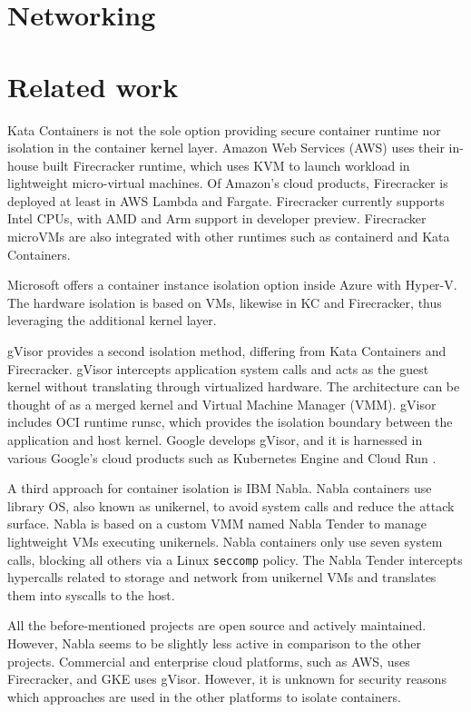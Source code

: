 \section{Networking}

\section{Related work}

Kata Containers is not the sole option providing secure container runtime nor isolation in the container kernel layer. Amazon Web Services (AWS) uses their in-house built Firecracker runtime, which uses KVM to launch workload in lightweight micro-virtual machines. Of Amazon's cloud products, Firecracker is deployed at least in AWS Lambda and Fargate. Firecracker currently supports Intel CPUs, with AMD and Arm support in developer preview. Firecracker microVMs are also integrated with other runtimes such as containerd and Kata Containers. \cite{AWS}\cite{Debab2021}\cite{FirecrackerDesign}

Microsoft offers a container instance isolation option inside Azure with Hyper-V. The hardware isolation is based on VMs, likewise in KC and Firecracker, thus leveraging the additional kernel layer. \cite{Hyper-V}

gVisor provides a second isolation method, differing from Kata Containers and Firecracker. gVisor intercepts application system calls and acts as the guest kernel without translating through virtualized hardware. The architecture can be thought of as a merged kernel and Virtual Machine Manager (VMM). gVisor includes OCI runtime runsc, which provides the isolation boundary between the application and host kernel. Google develops gVisor, and it is harnessed in various Google's cloud products such as Kubernetes Engine \cite{GKE} and Cloud Run \cite{CloudRun}. \cite{Debab2021}\cite{gVisor}

A third approach for container isolation is IBM Nabla\cite{Nabla}. Nabla containers use library OS, also known as unikernel, to avoid system calls and reduce the attack surface. Nabla is based on a custom VMM named Nabla Tender to manage lightweight VMs executing unikernels. Nabla containers only use seven system calls, blocking all others via a Linux \texttt{seccomp} policy. The Nabla Tender intercepts hypercalls related to storage and network from unikernel VMs and translates them into syscalls to the host. \cite{Debab2021}

All the before-mentioned projects are open source and actively maintained. However, Nabla seems to be slightly less active in comparison to the other projects. Commercial and enterprise cloud platforms, such as AWS, uses Firecracker, and GKE uses gVisor. However, it is unknown for security reasons which approaches are used in the other platforms to isolate containers.


